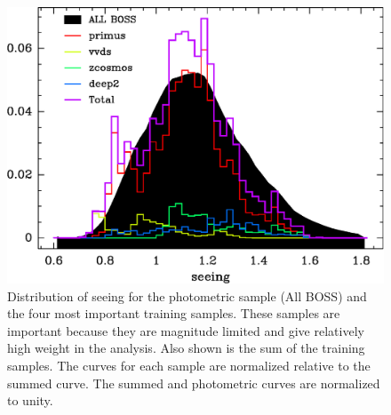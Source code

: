 \documentclass[preprint]{aastex}
\begin{document}


\begin{figure}[h]\centering
    \includegraphics[scale=0.7]{figures/primus-vvds-zcosmos-deep2-match-seeing-10.eps}

    \caption{Distribution of seeing for the photometric sample (All BOSS) and
    the four most important training samples.  These samples are important
    because they are magnitude limited and give relatively high weight in the
    analysis.  Also shown is the sum of the training samples.  The curves for
    each sample are normalized relative to the summed curve.  The summed and
    photometric curves are normalized to unity.}

    \label{fig:seeing}
\end{figure}
\end{document}
